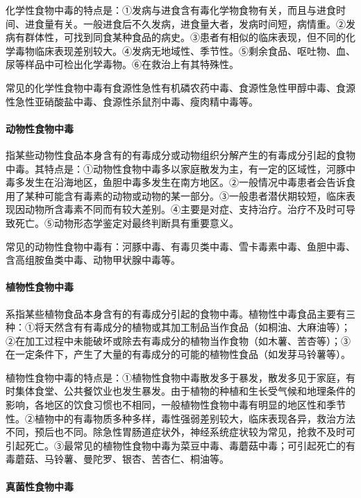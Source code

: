 化学性食物中毒的特点是：①发病与进食含有毒化学物食物有关，而且与进食时间、进食量有关。一般进食后不久发病，进食量大者，发病时间短，病情重。②发病有群体性，可找到同食某种食品的病史。③患者有相似的临床表现，但不同的化学毒物临床表现差别较大。④发病无地域性、季节性。⑤剩余食品、呕吐物、血、尿等样品中可检出化学毒物。⑥在救治上有其特殊性。

常见的化学性食物中毒有食源性急性有机磷农药中毒、食源性急性甲醇中毒、食源性急性亚硝酸盐中毒、食源性杀鼠剂中毒、瘦肉精中毒等。

\paragraph{动物性食物中毒}

指某些动物性食品本身含有的有毒成分或动物组织分解产生的有毒成分引起的食物中毒。其特点是：①动物性食物中毒多以家庭散发为主，有一定的区域性，河豚中毒多发生在沿海地区，鱼胆中毒多发生在南方地区。②一般情况中毒患者会告诉食用了某种可能含有毒素的动物或动物的某一部分。③一般患者潜伏期较短，临床表现因动物所含毒素不同而有较大差别。④主要是对症、支持治疗。治疗不及时可导致死亡。⑤动物形态学鉴定对最终判断具有重要意义。

常见的动物性食物中毒有：河豚中毒、有毒贝类中毒、雪卡毒素中毒、鱼胆中毒、含高组胺鱼类中毒、动物甲状腺中毒等。

\paragraph{植物性食物中毒}

系指某些植物食品本身含有的有毒成分引起的食物中毒。植物性中毒食品主要有三种：①将天然含有有毒成分的植物或其加工制品当作食品（如桐油、大麻油等）；②在加工过程中未能破坏或除去有毒成分的植物当作食物（如木薯、苦杏等）；③在一定条件下，产生了大量的有毒成分的可能的植物性食品（如发芽马铃薯等）。

植物性食物中毒的特点是：①植物性食物中毒散发多于暴发，散发多见于家庭，有时集体食堂、公共餐饮业也发生暴发。由于植物的种植和生长受气候和地理条件的影响，各地区的饮食习惯也不相同，一般植物性食物中毒有明显的地区性和季节性。②植物中的有毒物质多种多样，毒性强弱差别较大，临床表现各异，救治方法不同，预后也不同。除急性胃肠道症状外，神经系统症状较为常见，抢救不及时可引起死亡。③最常见的植物性食物中毒为菜豆中毒、毒蘑菇中毒；可引起死亡的有毒蘑菇、马铃薯、曼陀罗、银杏、苦杏仁、桐油等。

\paragraph{真菌性食物中毒}

